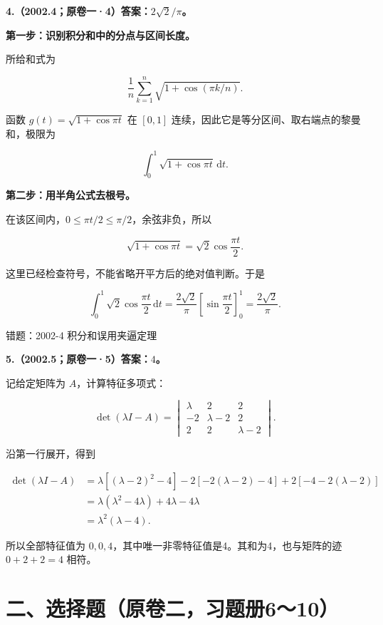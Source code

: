 \documentclass[UTF8,11pt,fontset=windows]{ctexart}
\begin{document}
\clearpage

\textbf{4.（2002.4；原卷一·4）答案：$2\sqrt2/\pi$。}

\textbf{第一步：识别积分和中的分点与区间长度。}

所给和式为

$$
\frac1n\sum_{k=1}^n\sqrt{1+\cos(\pi k/n)}.
$$

函数 $g(t)=\sqrt{1+\cos\pi t}$ 在 $[0,1]$ 连续，因此它是等分区间、取右端点的黎曼和，极限为

$$
\int_0^1\sqrt{1+\cos\pi t}\,\mathrm dt.
$$

\textbf{第二步：用半角公式去根号。}

在该区间内，$0\le\pi t/2\le\pi/2$，余弦非负，所以

$$
\sqrt{1+\cos\pi t}=\sqrt2\cos\frac{\pi t}{2}.
$$

这里已经检查符号，不能省略开平方后的绝对值判断。于是

$$
\int_0^1\sqrt2\cos\frac{\pi t}{2}\,\mathrm dt
=\frac{2\sqrt2}{\pi}\left[\sin\frac{\pi t}{2}\right]_0^1
=\frac{2\sqrt2}{\pi}.
$$

\begingroup\color{gray}错题：2002-4 积分和误用夹逼定理\par\endgroup

\clearpage

\textbf{5.（2002.5；原卷一·5）答案：$4$。}

记给定矩阵为 $A$，计算特征多项式：

$$
\det(\lambda I-A)
=\begin{vmatrix}\lambda&2&2\\-2&\lambda-2&2\\2&2&\lambda-2\end{vmatrix}.
$$

沿第一行展开，得到

$$
\begin{aligned}
\det(\lambda I-A)
&=\lambda[(\lambda-2)^2-4]
-2[-2(\lambda-2)-4]+2[-4-2(\lambda-2)]\\
&=\lambda(\lambda^2-4\lambda)+4\lambda-4\lambda\\
&=\lambda^2(\lambda-4).
\end{aligned}
$$

所以全部特征值为 $0,0,4$，其中唯一非零特征值是4。其和为4，也与矩阵的迹 $0+2+2=4$ 相符。

\clearpage

\section*{二、选择题（原卷二，习题册6～10）}
\end{document}
